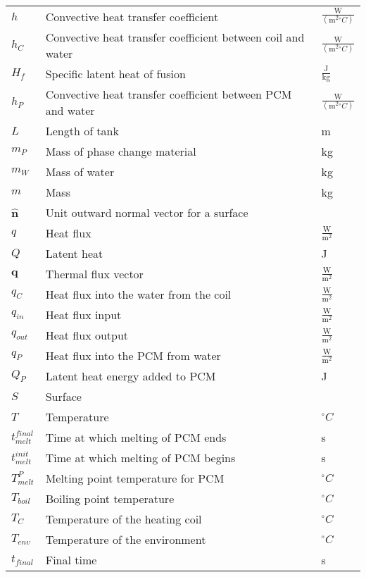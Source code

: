 \documentclass[12pt]{article}
\begin{document}
\begin{longtable*}{l l l}
$h$ & Convective heat transfer coefficient & $\frac{\text{W}}{(\text{m}^{2}{}^{\circ}C)}$
\\
$h_{C}$ & Convective heat transfer coefficient between coil and water & $\frac{\text{W}}{(\text{m}^{2}{}^{\circ}C)}$
\\
$H_{f}$ & Specific latent heat of fusion & $\frac{\text{J}}{\text{kg}}$
\\
$h_{P}$ & Convective heat transfer coefficient between PCM and water & $\frac{\text{W}}{(\text{m}^{2}{}^{\circ}C)}$
\\
$L$ & Length of tank & m
\\
$m_{P}$ & Mass of phase change material & kg
\\
$m_{W}$ & Mass of water & kg
\\
$m$ & Mass & kg
\\
$\mathbf{\hat{n}}$ & Unit outward normal vector for a surface & 
\\
$q$ & Heat flux & $\frac{\text{W}}{\text{m}^{2}}$
\\
$Q$ & Latent heat & J
\\
$\mathbf{q}$ & Thermal flux vector & $\frac{\text{W}}{\text{m}^{2}}$
\\
$q_{C}$ & Heat flux into the water from the coil & $\frac{\text{W}}{\text{m}^{2}}$
\\
$q_{in}$ & Heat flux input & $\frac{\text{W}}{\text{m}^{2}}$
\\
$q_{out}$ & Heat flux output & $\frac{\text{W}}{\text{m}^{2}}$
\\
$q_{P}$ & Heat flux into the PCM from water & $\frac{\text{W}}{\text{m}^{2}}$
\\
$Q_{P}$ & Latent heat energy added to PCM & J
\\
$S$ & Surface & 
\\
$T$ & Temperature & ${}^{\circ}C$
\\
$t_{melt}^{final}$ & Time at which melting of PCM ends & s
\\
$t_{melt}^{init}$ & Time at which melting of PCM begins & s
\\
$T_{melt}^{P}$ & Melting point temperature for PCM & ${}^{\circ}C$
\\
$T_{boil}$ & Boiling point temperature & ${}^{\circ}C$
\\
$T_{C}$ & Temperature of the heating coil & ${}^{\circ}C$
\\
$T_{env}$ & Temperature of the environment & ${}^{\circ}C$
\\
$t_{final}$ & Final time & s
\\

\end{longtable*}
\end{document}
